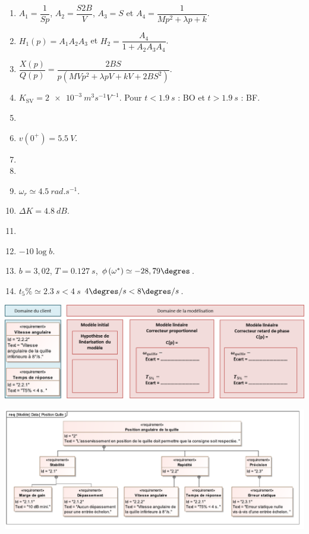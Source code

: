 \documentclass[10pt,fleqn]{article} %
\begin{document}
\begin{multicols}{2}
\ifprof
\else
\footnotesize

\begin{enumerate}
\item $A_1=\dfrac{1}{Sp}$,  $A_2 = \dfrac{S2B}{V} $,  $A_3 = S$  et $A_4 = \dfrac{1}{Mp^2  +\lambda p  + k}$.
\item $H_1(p)=A_1  A_2A_3$ et $H_2 = \dfrac{A_4}{1+ A_2A_3A_4 }$.
\item $\dfrac{X(p)}{Q(p)}=\dfrac{2BS}{p\left(MVp^2  +\lambda pV  + kV+ 2BS^2\right) }$.
\item  $K_{\text{SV}} = \SI{2e-3}{m^3 s^{-1}V^{-1}}$. Pour $t<\SI{1,9}{s}$ : BO et  $t>\SI{1,9}{s}$ : BF.
\item 
\item $v(0^{+})=\SI{5,5}{V}$.
\item 
\item 
\item  $\omega_r \simeq \SI{4,5}{rad.s^{-1}}$.
\item $\Delta K = \SI{4,8}{dB}$.
\item 
\item $-10\log b$.
\item  $b=3,02$,  $T=\SI{0,127}{s}$,   $\phi\left(\omega^{*}\right) \simeq -28,79\degres $.
\item $t_5\%\simeq \SI{2,3}{s}<\SI{4}{s}$ $ 4 \degres/s< 8 \degres/s$.
\end{enumerate}
\normalsize
\fi

\ifprof
\else
\end{multicols}
\fi


\ifprof
\else


\begin{center}
\includegraphics[width=\linewidth]{images/ecart}
\end{center}

\begin{center}
\includegraphics[width=.95\linewidth]{images/PositionQuille}
\end{center}


\fi
\end{document}
